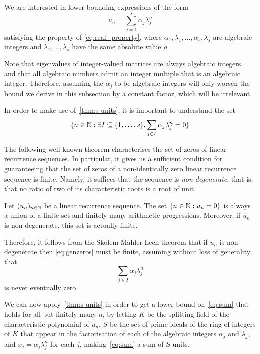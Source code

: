 We are interested in lower-bounding expressions of the form
\begin{equation}
\label{eq:sum}
u_{n}=\sum\limits_{j=1}^{s}\alpha_{j}\lambda_j^{n}
\end{equation}
satisfying the property of \cref{eq:real_property}, where $\alpha_{1}, \lambda_{1}, \ldots, \alpha_{s}, \lambda_{s}$ are algebraic integers and $\lambda_{1},\ldots,\lambda_{s}$ have the same absolute value $\rho$.

Note that eigenvalues of integer-valued matrices are always algebraic integers, and that all algebraic numbers admit an integer multiple that is an algebraic integer. Therefore, assuming the $\alpha_{j}$ to be algebraic integers will only worsen the bound we derive in this subsection by a constant factor, which will be irrelevant.

In order to make use of~\cref{thm:s-units}, it is important to understand the set
\begin{equation}
\lbrace n\in\Naturals: \exists I\subseteq \lbrace 1,\ldots,s\rbrace, \sum\limits_{j\in I}\alpha_j\lambda_j^n=0\rbrace
\label{eq:genzeros}
\end{equation}

The following well-known theorem characterises the set of zeros of linear recurrence sequences. In particular, it gives us a sufficient condition for guaranteeing that the set of zeros of a non-identically zero linear recurrence sequence is finite. Namely, it suffices that the sequence is \emph{non-degenerate}, that is, that no ratio of two of its characteristic roots is a root of unit.

\begin{theorem}
Let $(u_{n})_{n \in \mathbb{N}}$ be a linear recurrence sequence. The set $\lbrace n\in\mathbb{N}: u_n=0\rbrace$ is always a union of a finite set and finitely many arithmetic progressions. Moreover, if $u_n$ is non-degenerate, this set is actually finite.
\end{theorem}

Therefore, it follows from the Skolem-Mahler-Lech theorem that if $u_n$ is non-degenerate  then \eqref{eq:genzeros} must be finite, assuming without loss of generality that
\begin{equation*}
\sum\limits_{j\in I}\alpha_j\lambda_j^n
\end{equation*}
is never eventually zero.

We can now apply~\cref{thm:s-units} in order to get a lower bound on~\eqref{eq:sum} that holds for all but finitely many $n$, by letting $K$ be the splitting field of the characteristic polynomial of $u_n$, $S$ be the set of prime ideals of the ring of integers of $K$ that appear in the factorisation of each of the algebraic integers $\alpha_j$ and $\lambda_j$, and $x_j=\alpha_j\lambda_j^n$ for each $j$, making~\eqref{eq:sum} a sum of $S$-units.

